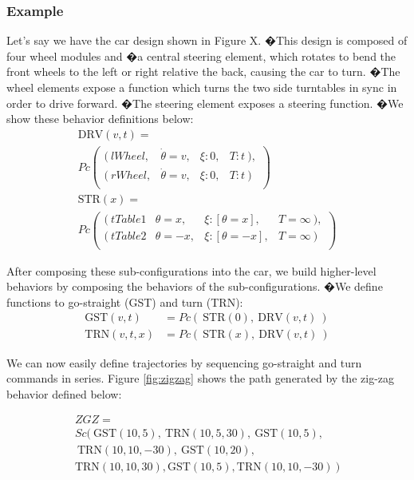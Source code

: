 \documentclass[conference]{IEEEtran}
\theoremstyle{definition}
\begin{document}
\subsubsection*{Example}
Let's say we have the
car design shown in Figure X. �This design is composed of four wheel modules
and �a central steering element, which rotates to bend the front wheels to the
left or right relative the back, causing the car to turn. �The wheel elements
expose a function which turns the two side turntables in sync in order to drive
forward. �The steering element exposes a steering function. �We
show these behavior  definitions below:
\begin{align*}
%
\mathrm{DRV}(v,t) =~~~~~~~~~~~~~~~~~~~~~~~~~~~~~~~~~~~~~~~~~~~~~~~~~~~ \\
Pc \left( \begin{array}{cccc}
(~lWheel, & \dot\theta=v, & \xi:0, & T:t~), \\
(~rWheel, & \dot\theta=v, & \xi:0, & T:t~) \\
\end{array} \right)\\
%
\mathrm{ST R}(x) = ~~~~~~~~~~~~~~~~~~~~~~~~~~~~~~~~~~~~~~~~~~~~~~~~~~~~ \\ 
Pc \left( \begin{array}{cccc}
(~tTable1 & \theta=x, & \xi:[\theta=x], & T=\infty~), \\
(~tTable2 & \theta=-x, & \xi: [\theta=-x], & T=\infty~) \\
\end{array} \right)
%
\end{align*}

After composing these sub-configurations into the car, we build higher-level
behaviors by composing the behaviors of the sub-configurations. �We define functions
to go-straight (GST) and turn (TRN):
\begin{align*}
\mathrm{GST}(v,t) &= Pc (~\mathrm{STR}(0),~ \mathrm{DRV}(v,t)~)\\
\mathrm{TRN}(v,t,x) &= Pc (~\mathrm{STR}(x),~\mathrm{DRV}(v,t)~)
\end{align*}

We can now easily define trajectories by sequencing go-straight and turn commands
in series. Figure \ref{fig:zigzag} shows the path generated by the zig-zag behavior defined
below:

\begin{align*}
ZGZ = ~~~~~~~~~~~~~~~~~~~~~~~~~~~~~~~~~~~~~~~~~~~~~~~~~~~~~~~~~\\
Sc(~\mathrm{GST}(10,5),~\mathrm{TRN}(10,5,30),~\mathrm{GST}(10,5),\\
~\mathrm{TRN}(10,10,-30),~\mathrm{GST}(10,20), \\
\mathrm{TRN}(10,10,30), \mathrm{GST}(10,5), \mathrm{TRN}(10,10, -30 )~)
\end{align*}
\end{document}
